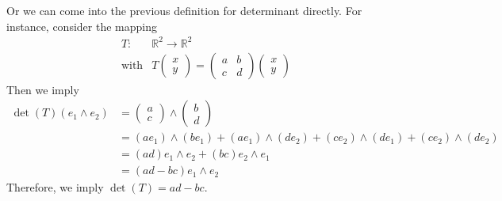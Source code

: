 Or we can come into the previous definition for determinant directly. 
For instance, consider the mapping
\[
\begin{array}{ll}
T:&\mathbb{R}^2\to\mathbb{R}^2\\
\text{with}&T\begin{pmatrix}
x\\y	
\end{pmatrix}
=
\begin{pmatrix}
a&b\\c&d
\end{pmatrix}\begin{pmatrix}
x\\y
\end{pmatrix}
\end{array}
\]
Then we imply
\begin{subequations}
\begin{align*}
\det(T)(e_1\wedge e_2)&=\begin{pmatrix}
a\\c
\end{pmatrix}\wedge\begin{pmatrix}
b\\d
\end{pmatrix}\\
&=(ae_1)\wedge(be_1)+(ae_1)\wedge(de_2)+(ce_2)\wedge(de_1)+(ce_2)\wedge(de_2)\\
&=(ad)e_1\wedge e_2 + (bc)e_2\wedge e_1\\
&=(ad-bc)e_1\wedge e_2
\end{align*}
\end{subequations}
Therefore, we imply $\det(T) = ad-bc$.










